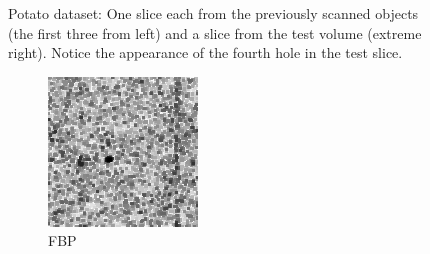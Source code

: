\documentclass[journal]{IEEEtran}
\begin{document}
\begin{figure}[!h]
\begin{subfigure}[b]{0.235\linewidth}
\captionsetup{labelformat=empty}
        \caption{}
\label{fig:potato_test}
     \end{subfigure}
      \caption{Potato dataset: One slice each from the previously scanned objects (the first three from left) and a slice from the test 
        volume (extreme right). Notice the appearance of the fourth
        hole in the test slice. }
\label{fig:object-prior_test_potato_A1}
\end{figure}
\begin{figure}[!h]
    \begin{subfigure}[b]{0.24\linewidth}
        \includegraphics[width=\textwidth]{../images/potato/2D/weightsIm_fbp30.png}
        \caption{FBP}
    \end{subfigure}
    \begin{subfigure}[b]{0.24\linewidth}

\end{subfigure}
\end{figure}
\end{document}
